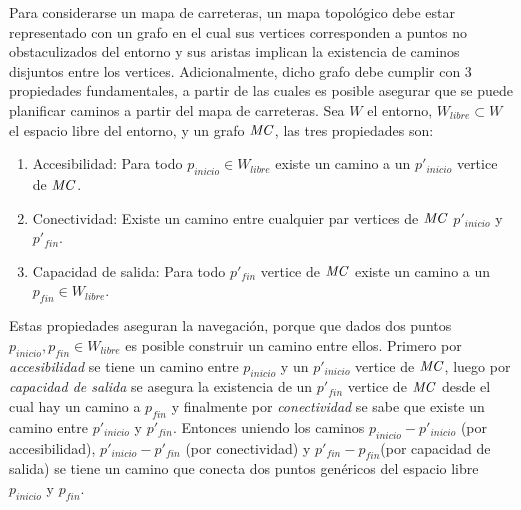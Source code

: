 Para considerarse un mapa de carreteras, un mapa topológico debe estar representado con un grafo en el cual sus vertices corresponden a puntos no obstaculizados del entorno y sus aristas implican la existencia de caminos disjuntos entre los vertices. Adicionalmente, dicho grafo debe cumplir con 3 propiedades fundamentales, a partir de las cuales es posible asegurar que se puede planificar caminos a partir del mapa de carreteras. Sea $W$ el entorno, $W_{libre} \subset W$ el espacio libre del entorno, y  un grafo $\mathit{MC}$, las tres propiedades son:

\begin{enumerate}
  \item Accesibilidad: Para todo $p_{inicio} \in W_{libre}$ existe un camino a un $p'_{inicio}$ vertice de $\mathit{MC}$.
  \item Conectividad: Existe un camino entre cualquier par vertices de $\mathit{MC}$ $p'_{inicio}$ y $p'_{fin}$.
  \item Capacidad de salida: Para todo $p'_{fin}$ vertice de $\mathit{MC}$ existe un camino a un $p_{fin} \in W_{libre}$.
\end{enumerate}

Estas propiedades aseguran la navegación, porque que dados dos puntos $p_{inicio},p_{fin}\in W_{libre}$ es posible construir un camino entre ellos. Primero por \emph{accesibilidad} se tiene un camino entre $p_{inicio}$ y un $p'_{inicio}$ vertice de $\mathit{MC}$, luego por \emph{capacidad de salida} se asegura la existencia de un  $p'_{fin}$ vertice de $\mathit{MC}$ desde el cual hay un camino a $p_{fin}$ y finalmente por \emph{conectividad} se sabe que existe un camino entre $p'_{inicio}$ y $p'_{fin}$. Entonces uniendo los caminos $p_{inicio} - p'_{inicio}$ (por accesibilidad), $p'_{inicio} - p'_{fin}$ (por conectividad) y $p'_{fin} - p_{fin}$(por capacidad de salida) se tiene un camino que conecta dos puntos genéricos del espacio libre $p_{inicio}$ y $p_{fin}$.


